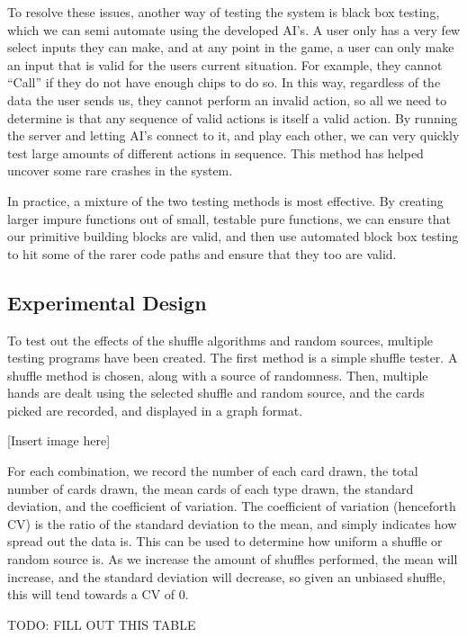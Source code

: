 To resolve these issues, another way of testing the system is black box
testing, which we can semi automate using the developed AI's. A user only
has a very few select inputs they can make, and at any point in the game,
a user can only make an input that is valid for the users current situation.
For example, they cannot ``Call'' if they do not have enough chips to do so.
In this way, regardless of the data the user sends us, they cannot perform
an invalid action, so all we need to determine is that any sequence of valid
actions is itself a valid action. By running the server and letting AI's
connect to it, and play each other, we can very quickly test large amounts
of different actions in sequence. This method has helped uncover some rare
crashes in the system.

In practice, a mixture of the two testing methods is most effective. By
creating larger impure functions out of small, testable pure functions, we
can ensure that our primitive building blocks are valid, and then use automated
block box testing to hit some of the rarer code paths and ensure that they
too are valid.

\newpage{}

\subsection{Experimental Design}
To test out the effects of the shuffle algorithms and random sources, multiple
testing programs have been created. The first method is a simple shuffle
tester. A shuffle method is chosen, along with a source of randomness. Then,
multiple hands are dealt using the selected shuffle and random source, and
the cards picked are recorded, and displayed in a graph format.

[Insert image here]

For each combination, we record the number of each card drawn, the total
number of cards drawn, the mean cards of each type drawn, the standard
deviation, and the coefficient of variation. The coefficient of variation
(henceforth CV) is the ratio of the standard deviation to the mean, and
simply indicates how spread out the data is. This can be used to determine
how uniform a shuffle or random source is. As we increase the amount of
shuffles performed, the mean will increase, and the standard deviation will
decrease, so given an unbiased shuffle, this will tend towards a CV of 0.

TODO: FILL OUT THIS TABLE

